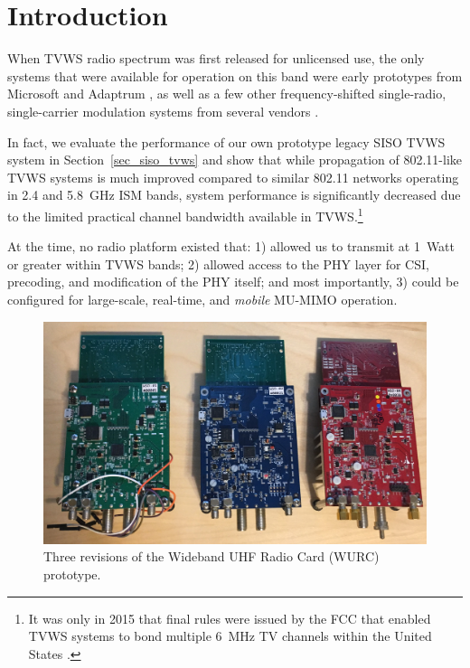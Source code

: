 \section{Introduction}
\label{sec_hw_intro}

	When \ac{TVWS} radio spectrum was first released for unlicensed use, the only systems that were available for operation on this band were early prototypes from Microsoft \cite{yuan2007knows} and Adaptrum \cite{ko2014television}, as well as a few other frequency-shifted single-radio, single-carrier modulation systems from several vendors \cite{ko2014television}. 

	In fact, we evaluate the performance of our own prototype legacy \ac{SISO} \ac{TVWS} system in Section~\ref{sec_siso_tvws} and show that while propagation of 802.11-like \ac{TVWS} systems is much improved compared to similar 802.11 networks operating in 2.4 and 5.8~GHz \ac{ISM} bands, system performance is significantly decreased due to the limited practical channel bandwidth available in \ac{TVWS}.\footnote{It was only in 2015 that final rules were issued by the FCC that enabled \ac{TVWS} systems to bond multiple 6~MHz TV channels within the United States \cite{fcc2015ro}.}
		
	At the time, no radio platform existed that: 1) allowed us to transmit at 1~Watt or greater within \ac{TVWS} bands; 2) allowed access to the \ac{PHY} layer for \ac{CSI}, precoding, and modification of the \ac{PHY} itself; and most importantly, 3) could be configured for large-scale, real-time, and \emph{mobile} \ac{MU-MIMO} operation.
	
\begin{figure}[ht]
\centering
  	\includegraphics[width=1\linewidth]{figs/wurc/wurc_versions}   
   	\caption{Three revisions of the Wideband UHF Radio Card (WURC) prototype.
	\label{fig_wurc_versions}}
\end{figure}

